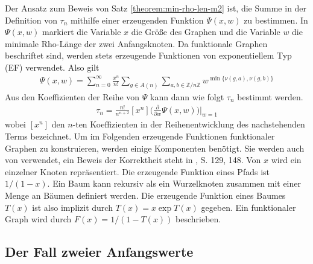 \documentclass[a4paper, 11pt, ngerman]{article}
\newcommand{\Z}{\mathbb{Z}}
\begin{document}
Der Ansatz zum Beweis von Satz \ref{theorem:min-rho-len-m2} ist, die Summe in der Definition von $\tau_n$ mithilfe einer erzeugenden Funktion $\Psi(x, w)$ zu bestimmen. In $\Psi(x, w)$ markiert die Variable $x$ die Größe des Graphen und die Variable $w$ die minimale Rho-Länge der zwei Anfangsknoten. Da funktionale Graphen beschriftet sind, werden stets erzeugende Funktionen von exponentiellem Typ (EF) verwendet. Also gilt
\begin{align}
    \Psi(x, w)
    = \sum_{n = 0}^\infty \frac {x^n}{n!} \sum_{g \in A(n)}
    \sum_{a, b \in \Z/n\Z} w^{\min\{\nu(g, a), \nu(g, b)\}}
    \label{psi-definition}
\end{align}
Aus den Koeffizienten der Reihe von $\Psi$ kann dann wie folgt $\tau_n$ bestimmt werden.
\begin{align*}
    \tau_n = \frac {n!}{n^{n + 2}} [x^n] \Bigg (\frac {\partial} {\partial w} \Psi(x, w) \Bigg ) \Bigg \vert_{w = 1}
\end{align*}
wobei $[x^n]$ den $n$-ten Koeffizienten in der Reihenentwicklung des nachstehenden Terms bezeichnet. Um im Folgenden erzeugende Funktionen funktionaler Graphen zu konstruieren, werden einige Komponenten benötigt. Sie werden auch von \cite{fo90} verwendet, ein Beweis der Korrektheit steht in \cite{fs09}, S. 129, 148. Von $x$ wird ein einzelner Knoten repräsentiert. Die erzeugende Funktion eines Pfads ist $1/(1 - x)$. Ein Baum kann rekursiv als ein Wurzelknoten zusammen mit einer Menge an Bäumen definiert werden. Die erzeugende Funktion eines Baumes $T(x)$ ist also implizit durch $T(x) = x \exp T(x)$ gegeben. Ein funktionaler Graph wird durch $F(x) = 1/(1 - T(x))$ beschrieben.

\subsection{Der Fall zweier Anfangswerte}
\end{document}
